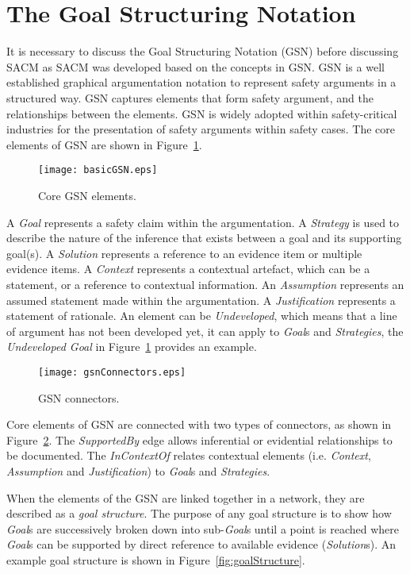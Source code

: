 \section{The Goal Structuring Notation}
\label{sec:gsn}
It is necessary to discuss the Goal Structuring Notation (GSN) before discussing SACM as SACM was developed based on the concepts in GSN. 
GSN is a well established graphical argumentation notation to represent safety arguments in a structured way. 
GSN captures elements that form safety argument, and the relationships between the elements. 
GSN is widely adopted within safety-critical industries for the presentation of safety arguments within safety cases. 
The core elements of GSN are shown in Figure~\ref{fig:gsnCore}.

\begin{figure}
	\centering
	\texttt{[image: basicGSN.eps]}
	\caption{Core GSN elements.}
	\label{fig:gsnCore}
\end{figure}

A \textit{Goal} represents a safety claim within the argumentation. 
A \textit{Strategy} is used to describe the nature of the inference that exists between a goal and its supporting goal(s). 
A \textit{Solution} represents a reference to an evidence item or multiple evidence items. 
A \textit{Context} represents a contextual artefact, which can be a statement, or a reference to contextual information. 
An \textit{Assumption} represents an assumed statement made within the argumentation. 
A \textit{Justification} represents a statement of rationale. 
An element can be \textit{Undeveloped}, which means that a line of argument has not been developed yet, it can apply to \textit{Goal}s and \textit{Strategies}, the \textit{Undeveloped Goal} in Figure~\ref{fig:gsnCore} provides an example. 

\begin{figure}
	\centering
	\texttt{[image: gsnConnectors.eps]}
	\caption{GSN connectors.}
	\label{fig:gsnEdges}
\end{figure}

Core elements of GSN are connected with two types of connectors, as shown in Figure~\ref{fig:gsnEdges}. 
The \textit{SupportedBy} edge allows inferential or evidential relationships to be documented. 
The \textit{InContextOf} relates contextual elements (i.e. \textit{Context}, \textit{Assumption} and \textit{Justification}) to \textit{Goal}s and \textit{Strategies}.

When the elements of the GSN are linked together in a network, they are described as a \textit{goal structure}. 
The purpose of any goal structure is to show how \textit{Goal}s are successively broken down into sub-\textit{Goal}s until a point is reached where \textit{Goal}s can be supported by direct reference to available evidence (\textit{Solution}s). 
An example goal structure is shown in Figure~\ref{fig:goalStructure}.

